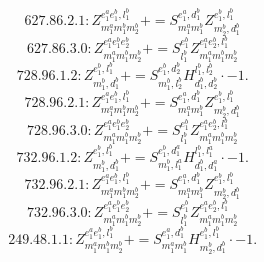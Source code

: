 \documentclass[letterpaper,10pt,fleqn,leqno,onecolumn]{article}
\begin{document}
\begin{equation} \;\;\;\;\;\;  627.86.2.1: Z^{e_{1}^{a}e_{1}^{b},l_{1}^{b}}_{m_{1}^{a}m_{1}^{b}m_{2}^{b}}+=S^{e_{1}^{a},d_{1}^{b}}_{m_{1}^{a}m_{1}^{b}}Z^{e_{1}^{b},l_{1}^{b}}_{m_{2}^{b},d_{1}^{b}} \end{equation}
\begin{equation} \;\;\;\;\;\;  627.86.3.0: Z^{e_{1}^{a}e_{1}^{b}e_{2}^{b}}_{m_{1}^{a}m_{1}^{b}m_{2}^{b}}+=S^{e_{1}^{b}}_{l_{1}^{b}}Z^{e_{1}^{a}e_{2}^{b},l_{1}^{b}}_{m_{1}^{a}m_{1}^{b}m_{2}^{b}} \end{equation}
\begin{equation} \;\;\;\;\;\;  728.96.1.2: Z^{e_{1}^{b},l_{1}^{b}}_{m_{1}^{b},d_{1}^{b}}+=S^{e_{1}^{b},d_{2}^{b}}_{m_{1}^{b},l_{2}^{b}}H^{l_{1}^{b},l_{2}^{b}}_{d_{1}^{b},d_{2}^{b}}\cdot -1. \end{equation}
\begin{equation} \;\;\;\;\;\;  728.96.2.1: Z^{e_{1}^{a}e_{1}^{b},l_{1}^{b}}_{m_{1}^{a}m_{1}^{b}m_{2}^{b}}+=S^{e_{1}^{a},d_{1}^{b}}_{m_{1}^{a}m_{1}^{b}}Z^{e_{1}^{b},l_{1}^{b}}_{m_{2}^{b},d_{1}^{b}} \end{equation}
\begin{equation} \;\;\;\;\;\;  728.96.3.0: Z^{e_{1}^{a}e_{1}^{b}e_{2}^{b}}_{m_{1}^{a}m_{1}^{b}m_{2}^{b}}+=S^{e_{1}^{b}}_{l_{1}^{b}}Z^{e_{1}^{a}e_{2}^{b},l_{1}^{b}}_{m_{1}^{a}m_{1}^{b}m_{2}^{b}} \end{equation}
\begin{equation} \;\;\;\;\;\;  732.96.1.2: Z^{e_{1}^{b},l_{1}^{b}}_{m_{1}^{b},d_{1}^{b}}+=S^{e_{1}^{b},d_{1}^{a}}_{m_{1}^{b},l_{1}^{a}}H^{l_{1}^{b},l_{1}^{a}}_{d_{1}^{b},d_{1}^{a}}\cdot -1. \end{equation}
\begin{equation} \;\;\;\;\;\;  732.96.2.1: Z^{e_{1}^{a}e_{1}^{b},l_{1}^{b}}_{m_{1}^{a}m_{1}^{b}m_{2}^{b}}+=S^{e_{1}^{a},d_{1}^{b}}_{m_{1}^{a}m_{1}^{b}}Z^{e_{1}^{b},l_{1}^{b}}_{m_{2}^{b},d_{1}^{b}} \end{equation}
\begin{equation} \;\;\;\;\;\;  732.96.3.0: Z^{e_{1}^{a}e_{1}^{b}e_{2}^{b}}_{m_{1}^{a}m_{1}^{b}m_{2}^{b}}+=S^{e_{1}^{b}}_{l_{1}^{b}}Z^{e_{1}^{a}e_{2}^{b},l_{1}^{b}}_{m_{1}^{a}m_{1}^{b}m_{2}^{b}} \end{equation}
\begin{equation} \;\;\;\;\;\;  249.48.1.1: Z^{e_{1}^{a}e_{1}^{b},l_{1}^{b}}_{m_{1}^{a}m_{1}^{b}m_{2}^{b}}+=S^{e_{1}^{a},d_{1}^{b}}_{m_{1}^{a}m_{1}^{b}}H^{e_{1}^{b},l_{1}^{b}}_{m_{2}^{b},d_{1}^{b}}\cdot -1. \end{equation}
\end{document}
